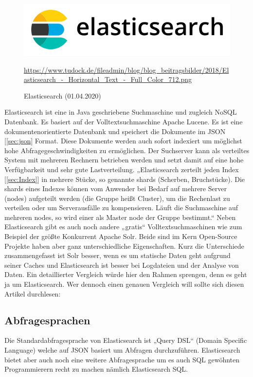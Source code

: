 \begin{figure}[H]
    \centering
    \includegraphics[scale=1]{images/ESLogo.PNG}
    \caption{Elasticsearch (01.04.2020)}
    \url{https://www.tudock.de/fileadmin/blog/blog_beitragsbilder/2018/Elasticsearch_-_Horizontal_Text_-_Full_Color_712.png}
\end{figure}
Elasticsearch ist eine in Java geschriebene Suchmaschine und zugleich NoSQL Datenbank. Es basiert auf der Volltextsuchmaschine Apache Lucene. Es ist eine dokumentenorientierte Datenbank und speichert die Dokumente im JSON [\ref{sec:json} Format. Diese Dokumente werden auch sofort indexiert um möglichst hohe Abfragegeschwindigkeiten zu ermöglichen. Der Suchserver kann als verteiltes System mit mehreren Rechnern betrieben werden und setzt damit auf eine hohe Verfügbarkeit und sehr gute Lastverteilung. „Elasticsearch zerteilt jeden Index [\ref{sec:Index}] in mehrere Stücke, so genannte shards (Scherben, Bruchstücke). Die shards eines Indexes können vom Anwender bei Bedarf auf mehrere Server (nodes) aufgeteilt werden (die Gruppe heißt Cluster), um die Rechenlast zu verteilen oder um Serverausfälle zu kompensieren. Läuft die Suchmaschine auf mehreren nodes, so wird einer als Master node der Gruppe bestimmt.“ \cite{PhysAufbau}
Neben Elasticsearch gibt es auch noch andere „gratis“ Volltextsuchmaschinen wie zum Beispiel der größte Konkurrent Apache Solr. Beide sind im Kern Open-Source Projekte haben aber ganz unterschiedliche Eigenschaften. Kurz die Unterschiede zusammengefasst ist Solr besser, wenn es um statische Daten geht aufgrund seiner Caches und Elasticsearch ist besser bei Logdateien und der Analyse von Daten. Ein detaillierter Vergleich würde hier den Rahmen sprengen, denn es geht ja um Elasticsearch. Wer dennoch einen genauen Vergleich will sollte sich diesen Artikel durchlesen: \cite{ESvsSolr}
\subsection{Abfragesprachen}
Die Standardabfragesprache von Elasticsearch ist „Query DSL“ (Domain Specific Language) welche auf JSON basiert um Abfragen durchzuführen. Elasticsearch bietet aber auch noch eine weitere Abfragesprache um es auch SQL gewöhnten Programmierern recht zu machen nämlich Elasticsearch SQL.
